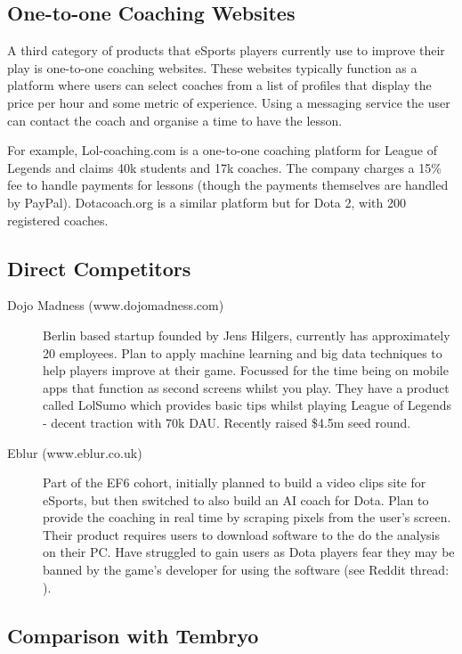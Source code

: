 \documentclass[12pt]{article} %
\begin{document}
\subsection{One-to-one Coaching Websites }
 
A third category of products that eSports players currently use to improve their play is one-to-one coaching websites. These websites typically function as a platform where users can select coaches from a list of profiles that display the price per hour and some metric of experience. Using a messaging service the user can contact the coach and organise a time to have the lesson.
 
For example, Lol-coaching.com is a one-to-one coaching platform for League of Legends and claims 40k students and 17k coaches. The company charges a 15\% fee to handle payments for lessons (though the payments themselves are handled by PayPal). Dotacoach.org is a similar platform but for Dota 2, with 200 registered coaches.

\subsection{Direct Competitors}

\begin{description}
 \item [Dojo Madness (www.dojomadness.com)] Berlin based startup founded by Jens Hilgers, currently has approximately 20 employees. Plan to apply machine learning and big data techniques to help players improve at their game. Focussed for the time being on mobile apps that function as second screens whilst you play. They have a product called LolSumo which provides basic tips whilst playing League of Legends - decent traction with 70k DAU. Recently raised \$4.5m seed round.

 \item [Eblur (www.eblur.co.uk)] Part of the EF6 cohort, initially planned to build a video clips site for eSports, but then switched to also build an AI coach for Dota. Plan to provide the coaching in real time by scraping pixels from the user's screen. Their product requires users to download software to the do the analysis on their PC. Have struggled to gain users as Dota players fear they may be banned by the game's developer for using the software (see Reddit thread: \cite{Eblur}).
\end{description}

\subsection{Comparison with Tembryo}
 
\end{document}
